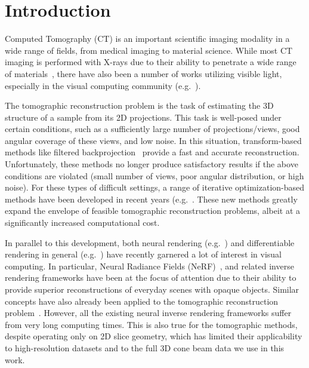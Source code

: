 \documentclass[acmtog,nonacm]{acmart} \acmSubmissionID{0438}
\begin{document}
\section{Introduction}

Computed Tomography (CT) is an important scientific imaging modality
in a wide range of fields, from medical imaging to material
science. While most CT imaging is performed with X-rays due to their
ability to penetrate a wide range of
materials~\cite{kak2001principles}, there have also been a number of
works utilizing visible light, especially in the visual computing
community (e.g.~\cite{hasinoff2007photo, atcheson2008time,
  gregson2012stochastic, eckert2019scalarflow, zang2020tomofluid}).

The tomographic reconstruction problem is the task of estimating the
3D structure of a sample from its 2D projections. This task is well-posed
under certain conditions, such as a sufficiently large number of
projections/views, good angular coverage of these views, and low
noise. In this situation, transform-based methods like filtered
backprojection~\cite{feldkamp1984practical} provide a fast and
accurate reconstruction. Unfortunately, these methods no longer
produce satisfactory results if the above conditions are violated
(small number of views, poor angular distribution, or high noise). For
these types of difficult settings, a range of iterative
optimization-based methods have been developed in recent years
(e.g.~\cite{sidky2008image, huang2013iterative, huang2018scale,
  zang2018super, xu2020limited}. These new methods greatly expand the
envelope of feasible tomographic reconstruction problems, albeit at a
significantly increased computational cost.

In parallel to this development, both neural rendering
(e.g.~\cite{liu2020neural, reiser2021kilonerf, garbin2021fastnerf})
and differentiable rendering in general
(e.g.~\cite{nimier2019mitsuba}) have recently garnered a lot of
interest in visual computing. In particular, Neural Radiance Fields
(NeRF)~\cite{mildenhall2020nerf}, and related inverse rendering
frameworks have been at the focus of attention due to their ability to
provide superior reconstructions of everyday scenes with opaque
objects. Similar concepts have also already been applied to the
tomographic reconstruction problem~\cite{zang2021intratomo,
  sun2021coil}. However, all the existing neural inverse rendering
frameworks suffer from very long computing times. This is also true
for the tomographic methods, despite operating only on 2D slice geometry,
which has limited their applicability to high-resolution datasets
and to the full 3D cone beam data we use in this work.
\end{document}
